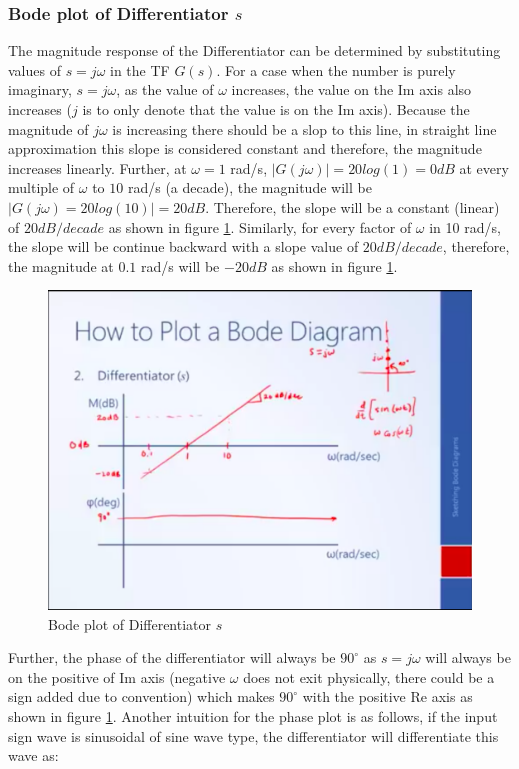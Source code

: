 \subsubsection{Bode plot of Differentiator $s$}

The magnitude response of the Differentiator can be determined by substituting values of $s = j \omega$ in the TF $G(s)$. For a case when the number is purely imaginary, $s = j \omega$, as the value of $\omega$ increases, the value on the Im axis also increases ($j$ is to only denote that the value is on the Im axis). Because the magnitude of $j \omega$ is increasing there should be a slop to this line, in straight line approximation this slope is considered constant and therefore, the magnitude increases linearly. Further, at $ \omega = 1$ rad/s, $|G(j \omega)| = 20 log(1) = 0 dB$ at every multiple of $\omega$ to $10$ rad/s (a decade), the magnitude will be $|G(j \omega) = 20 log(10)| = 20 dB$. Therefore, the slope will be a constant (linear) of $20 dB/decade$ as shown in figure \ref{Fig_FreqResp_BodePlot_s}. Similarly, for every factor of $\omega$ in 10 rad/s, the slope will be continue backward with a slope value of $20 dB/decade$, therefore, the magnitude at $0.1$ rad/s will be $-20 dB$ as shown in figure \ref{Fig_FreqResp_BodePlot_s}.
\begin{figure}[h!]
	\centering
	\includegraphics[width=\linewidth]{Bilder/FreqResp_BodePlot_s}
	\caption{Bode plot of Differentiator $s$}
	\label{Fig_FreqResp_BodePlot_s}
\end{figure}
Further, the phase of the differentiator will always be $90^{\circ}$ as $s = j \omega$ will always be on the positive of Im axis (negative $\omega$ does not exit physically, there could be a sign added due to convention) which makes $90^{\circ}$ with the positive Re axis as shown in figure \ref{Fig_FreqResp_BodePlot_s}. Another intuition for the phase plot is as follows, if the input sign wave is sinusoidal of sine wave type, the differentiator will differentiate this wave as:
